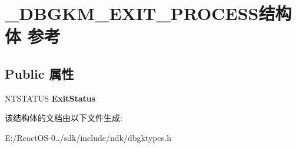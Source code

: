 \hypertarget{struct___d_b_g_k_m___e_x_i_t___p_r_o_c_e_s_s}{}\section{\+\_\+\+D\+B\+G\+K\+M\+\_\+\+E\+X\+I\+T\+\_\+\+P\+R\+O\+C\+E\+S\+S结构体 参考}
\label{struct___d_b_g_k_m___e_x_i_t___p_r_o_c_e_s_s}
\subsection*{Public 属性}
\begin{DoxyCompactItemize}
\item 
\mbox{\label{struct___d_b_g_k_m___e_x_i_t___p_r_o_c_e_s_s_afdf54ca2ee68762bcb88759d9501d0a8}} 
N\+T\+S\+T\+A\+T\+US {\bfseries Exit\+Status}
\end{DoxyCompactItemize}


该结构体的文档由以下文件生成\+:\begin{DoxyCompactItemize}
\item 
E\+:/\+React\+O\+S-\/0../sdk/include/ndk/dbgktypes.\+h\end{DoxyCompactItemize}
